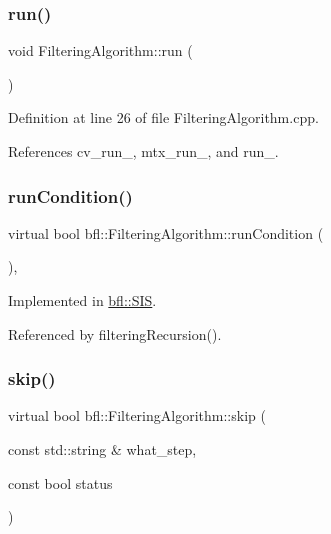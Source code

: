 \subsubsection{\texorpdfstring{run()}{run()}}
{\footnotesize\ttfamily void Filtering\+Algorithm\+::run (\begin{DoxyParamCaption}{ }\end{DoxyParamCaption})}



Definition at line 26 of file Filtering\+Algorithm.\+cpp.



References cv\+\_\+run\+\_\+, mtx\+\_\+run\+\_\+, and run\+\_\+.

\mbox{\label{classbfl_1_1FilteringAlgorithm_a5fc12882356f6906b102fbfff2bc4b7c}} 
\subsubsection{\texorpdfstring{run\+Condition()}{runCondition()}}
{\footnotesize\ttfamily virtual bool bfl\+::\+Filtering\+Algorithm\+::run\+Condition (\begin{DoxyParamCaption}{ }\end{DoxyParamCaption})\hspace{0.3cm}{\ttfamily [protected]}, {}}



Implemented in \mbox{\hyperlink{classbfl_1_1SIS_afb7cff1f7dae80e0e4ca84c925ca3ac3}{bfl\+::\+S\+IS}}.



Referenced by filtering\+Recursion().

\mbox{\label{classbfl_1_1FilteringAlgorithm_ac8a718a614905d89d6a43bbbc70d68b2}} 
\subsubsection{\texorpdfstring{skip()}{skip()}}
{\footnotesize\ttfamily virtual bool bfl\+::\+Filtering\+Algorithm\+::skip (\begin{DoxyParamCaption}\item[{const std\+::string \&}]{what\+\_\+step,  }\item[{const bool}]{status }\end{DoxyParamCaption})\hspace{0.3cm}{\ttfamily [pure virtual]}}



